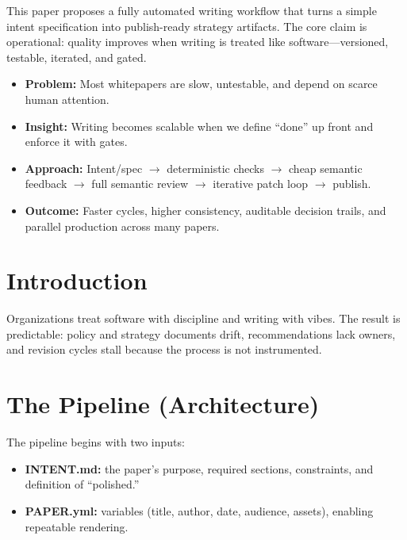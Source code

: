 \documentclass[11pt]{article}
\begin{document}
\makepapercover

{\small\renewcommand{\baselinestretch}{0.96}\selectfont\tableofcontents}
\newpage

\begin{execsummary}
This paper proposes a fully automated writing workflow that turns a simple intent specification into publish-ready strategy artifacts. The core claim is operational: quality improves when writing is treated like software---versioned, testable, iterated, and gated.

\begin{itemize}
  \item \textbf{Problem:} Most whitepapers are slow, untestable, and depend on scarce human attention.
  \item \textbf{Insight:} Writing becomes scalable when we define ``done'' up front and enforce it with gates.
  \item \textbf{Approach:} Intent/spec $\rightarrow$ deterministic checks $\rightarrow$ cheap semantic feedback $\rightarrow$ full semantic review $\rightarrow$ iterative patch loop $\rightarrow$ publish.
  \item \textbf{Outcome:} Faster cycles, higher consistency, auditable decision trails, and parallel production across many papers.
\end{itemize}
\end{execsummary}

\section{Introduction}
Organizations treat software with discipline and writing with vibes. The result is predictable: policy and strategy documents drift, recommendations lack owners, and revision cycles stall because the process is not instrumented.

\section{The Pipeline (Architecture)}
The pipeline begins with two inputs:
\begin{itemize}
  \item \textbf{INTENT.md:} the paper's purpose, required sections, constraints, and definition of ``polished.''
  \item \textbf{PAPER.yml:} variables (title, author, date, audience, assets), enabling repeatable rendering.
\end{itemize}
\end{document}
